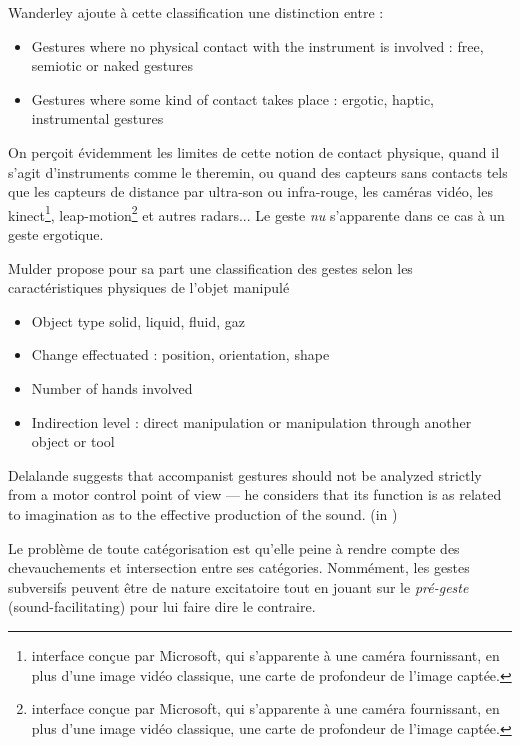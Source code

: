 Wanderley ajoute à cette classification une distinction entre :
\vspace{-1em}
\begin{itemize}[noitemsep]
\item Gestures where no physical contact with the instrument is involved : free, semiotic or naked gestures
\item Gestures where some kind of contact takes place : ergotic, haptic, instrumental gestures
\end{itemize}

On perçoit évidemment les limites de cette notion de contact physique, quand il s'agit d'instruments comme le theremin, ou quand des capteurs sans contacts tels que les capteurs de distance par ultra-son ou infra-rouge, les caméras vidéo, les kinect\footnote{interface conçue par Microsoft, qui s'apparente à une caméra fournissant, en plus d'une image vidéo classique, une carte de profondeur de l'image captée.}, leap-motion\footnote{interface conçue par Microsoft, qui s'apparente à une caméra fournissant, en plus d'une image vidéo classique, une carte de profondeur de l'image captée.} et autres radars... Le geste \textit{nu} s'apparente dans ce cas à un geste ergotique.


Mulder \cite{mulder_mulder_2000} propose pour sa part une classification des gestes selon les caractéristiques physiques de l'objet manipulé
\vspace{-1em}
\begin{itemize}[noitemsep]
\item Object type solid, liquid, fluid, gaz
\item Change effectuated : position, orientation, shape
\item Number of hands involved
\item Indirection level : direct manipulation or manipulation through another object or tool
\end{itemize}


Delalande suggests that accompanist gestures should not be analyzed strictly from a motor control point of view — he considers that its function is as related to imagination as to the effective production of the sound. (in \cite{cadoz_gesture_2000})

Le problème de toute catégorisation est qu'elle peine à rendre compte des chevauchements et intersection entre ses catégories. Nommément, les gestes subversifs peuvent être de nature excitatoire tout en jouant sur le \textit{pré-geste} (sound-facilitating) pour lui faire dire le contraire.

